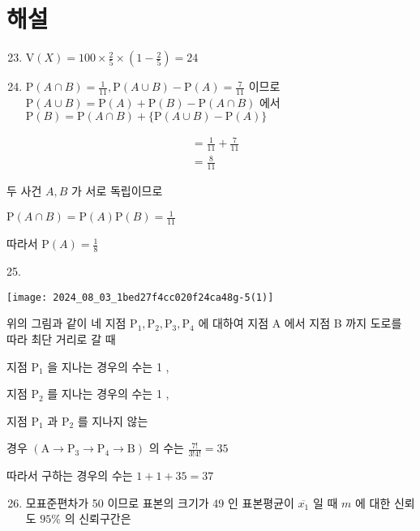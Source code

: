 \documentclass[10pt]{article}
\begin{document}
\section*{해설}
\begin{enumerate}
  \setcounter{enumi}{22}
  \item \(\mathrm{V}(X)=100 \times \frac{2}{5} \times\left(1-\frac{2}{5}\right)=24\)

  \item \(\mathrm{P}(A \cap B)=\frac{1}{11}, \mathrm{P}(A \cup B)-\mathrm{P}(A)=\frac{7}{11}\) 이므로 \(\mathrm{P}(A \cup B)=\mathrm{P}(A)+\mathrm{P}(B)-\mathrm{P}(A \cap B)\) 에서 \(\mathrm{P}(B)=\mathrm{P}(A \cap B)+\{\mathrm{P}(A \cup B)-\mathrm{P}(A)\}\)

\end{enumerate}

\[
\begin{aligned}
& =\frac{1}{11}+\frac{7}{11} \\
& =\frac{8}{11}
\end{aligned}
\]

두 사건 \(A, B\) 가 서로 독립이므로

\(\mathrm{P}(A \cap B)=\mathrm{P}(A) \mathrm{P}(B)=\frac{1}{11}\)

따라서 \(\mathrm{P}(A)=\frac{1}{8}\)

25.

\begin{center}
\texttt{[image: 2024\_08\_03\_1bed27f4cc020f24ca48g-5(1)]}
\end{center}

위의 그림과 같이 네 지점 \(\mathrm{P}_{1}, \mathrm{P}_{2}, \mathrm{P}_{3}, \mathrm{P}_{4}\) 에 대하여 지점 A 에서 지점 B 까지 도로를 따라 최단 거리로 갈 때

지점 \(\mathrm{P}_{1}\) 을 지나는 경우의 수는 1 ,

지점 \(\mathrm{P}_{2}\) 를 지나는 경우의 수는 1 ,

지점 \(\mathrm{P}_{1}\) 과 \(\mathrm{P}_{2}\) 를 지나지 않는

경우 \(\left(\mathrm{A} \rightarrow \mathrm{P}_{3} \rightarrow \mathrm{P}_{4} \rightarrow \mathrm{B}\right)\) 의 수는 \(\frac{7!}{3!4!}=35\)

따라서 구하는 경우의 수는 \(1+1+35=37\)

\begin{enumerate}
  \setcounter{enumi}{25}
  \item 모표준편차가 50 이므로 표본의 크기가 49 인 표본평균이 \(\overline{x_{1}}\) 일 때 \(m\) 에 대한 신뢰도 \(95 \%\) 의 신뢰구간은
\end{enumerate}
\end{document}
